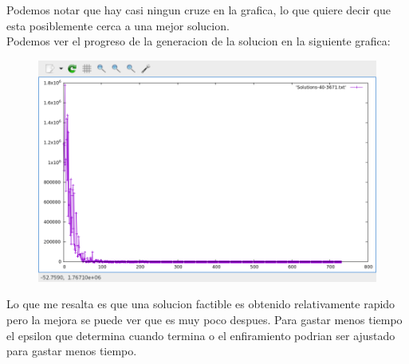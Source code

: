 \documentclass{article}
\begin{document}
    Podemos notar que hay casi ningun cruze en la grafica, lo que quiere decir que esta posiblemente cerca a
    una mejor solucion.\\
    
    Podemos ver el progreso de la generacion de la solucion en la siguiente grafica:
    \newpage
    \begin{figure}[h]
        \centering
        \includegraphics[scale=.35]{Solutions40.png}
    \end{figure}
    Lo que me resalta es que una solucion factible es obtenido relativamente rapido pero la mejora se puede
    ver que es muy poco despues. Para gastar menos tiempo el epsilon que determina cuando termina o 
    el enfiramiento podrian ser ajustado para gastar menos tiempo.\\
    
\end{document}

